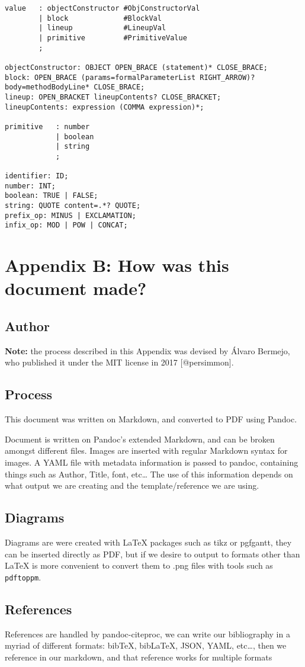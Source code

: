 \begin{verbatim}
value   : objectConstructor #ObjConstructorVal
        | block             #BlockVal
        | lineup            #LineupVal
        | primitive         #PrimitiveValue
        ;

objectConstructor: OBJECT OPEN_BRACE (statement)* CLOSE_BRACE;
block: OPEN_BRACE (params=formalParameterList RIGHT_ARROW)? body=methodBodyLine* CLOSE_BRACE;
lineup: OPEN_BRACKET lineupContents? CLOSE_BRACKET;
lineupContents: expression (COMMA expression)*;

primitive   : number
            | boolean
            | string
            ;

identifier: ID;
number: INT;
boolean: TRUE | FALSE;
string: QUOTE content=.*? QUOTE;
prefix_op: MINUS | EXCLAMATION;
infix_op: MOD | POW | CONCAT;
\end{verbatim}

\chapter{Appendix B: How was this document
made?}\label{appendix-b-how-was-this-document-made}

\section{Author}\label{author}

\textbf{Note:} the process described in this Appendix was devised by
Álvaro Bermejo, who published it under the MIT license in 2017
{[}@persimmon{]}.

\section{Process}\label{process}

This document was written on Markdown, and converted to PDF using
Pandoc.

Document is written on Pandoc’s extended Markdown, and can be broken
amongst different files. Images are inserted with regular Markdown
syntax for images. A YAML file with metadata information is passed to
pandoc, containing things such as Author, Title, font, etc\ldots{} The
use of this information depends on what output we are creating and the
template/reference we are using.

\section{Diagrams}\label{diagrams}

Diagrams are were created with LaTeX packages such as tikz or pgfgantt,
they can be inserted directly as PDF, but if we desire to output to
formats other than LaTeX is more convenient to convert them to .png
files with tools such as \texttt{pdftoppm}.

\section{References}\label{references}

References are handled by pandoc-citeproc, we can write our bibliography
in a myriad of different formats: bibTeX, bibLaTeX, JSON, YAML,
etc\ldots{}, then we reference in our markdown, and that reference works
for multiple formats

